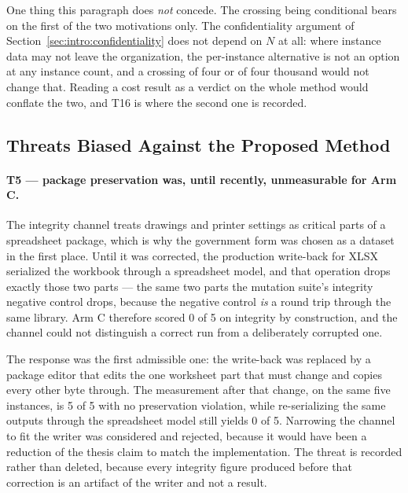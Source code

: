 One thing this paragraph does \emph{not} concede. The crossing being conditional bears on the
first of the two motivations only. The confidentiality argument of
Section~\ref{sec:intro:confidentiality} does not depend on $N$ at all: where instance data may
not leave the organization, the per-instance alternative is not an option at any instance
count, and a crossing of four or of four thousand would not change that. Reading a cost result
as a verdict on the whole method would conflate the two, and T16 is where the second one is
recorded.

\subsection{Threats Biased Against the Proposed Method}
\label{sec:eval:threats:unfavourable}

\paragraph{T5 --- package preservation was, until recently, unmeasurable for Arm C.}
The integrity channel treats drawings and printer settings as critical parts of a spreadsheet
package, which is why the government form was chosen as a dataset in the first place. Until it
was corrected, the production write-back for XLSX serialized the workbook through a
spreadsheet model, and that operation drops exactly those two parts --- the same two parts the
mutation suite's integrity negative control drops, because the negative control \emph{is} a
round trip through the same library. Arm C therefore scored 0 of 5 on integrity by
construction, and the channel could not distinguish a correct run from a deliberately
corrupted one.

The response was the first admissible one: the write-back was replaced by a package editor
that edits the one worksheet part that must change and copies every other byte through. The
measurement after that change, on the same five instances, is 5 of 5 with no preservation
violation, while re-serializing the same outputs through the spreadsheet model still yields 0
of 5. Narrowing the channel to fit the writer was considered and rejected, because it would
have been a reduction of the thesis claim to match the implementation. The threat is recorded
rather than deleted, because every integrity figure produced before that correction is an
artifact of the writer and not a result.

